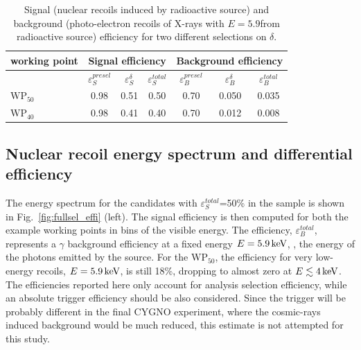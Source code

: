 \begin{table}[t]

\caption{Signal (nuclear recoils induced by \ambe radioactive source) and background (photo-electron recoils of X-rays
         with $E=5.9$\keV from \fe radioactive source) efficiency for
         two different selections on $\delta$.\label{tab:roc}}

\vspace{10pt}
\normalsize
\centering
\begin{tabular}{l c c c | c c c }
  \hline\hline
  working point & \multicolumn{3}{c}{Signal efficiency} & \multicolumn{3}{c}{Background efficiency} \\
  \hline
  & $\varepsilon_{S}^{presel}$ & $\varepsilon_{S}^{\delta}$ & $\varepsilon_{S}^{total}$ & $\varepsilon_{B}^{presel}$ & $\varepsilon_{B}^{\delta}$ & $\varepsilon_{B}^{total}$ \\
  \hline
  $\mathrm{WP}_{50}$  & 0.98                        & 0.51                      & 0.50                     & 0.70                     & 0.050                     & 0.035 \\
  $\mathrm{WP}_{40}$  & 0.98                        & 0.41                      & 0.40                     & 0.70                     & 0.012                     & 0.008 \\
  \hline\hline
\end{tabular}
\end{table}



\subsection{Nuclear recoil energy spectrum and differential efficiency}

The energy spectrum for the candidates with
$\varepsilon_{S}^{total}$=50\% in the \ambe sample is shown in
Fig.~\ref{fig:fullsel_effi} (left).  The signal efficiency is then
computed for both the example working points in bins of the visible
energy. The efficiency, $\varepsilon_{B}^{total}$, represents a
$\gamma$ background efficiency at a fixed energy $E=5.9\,\textrm{ke\hspace{-.08em}V}$, \ie, the
energy of the photons emitted by the \fe source. For the
$\mathrm{WP}_{50}$, the efficiency for very low-energy recoils,
$E=5.9\,\textrm{ke\hspace{-.08em}V}$, is still 18\%, dropping to almost zero at
$E\lesssim4\,\textrm{ke\hspace{-.08em}V}$. The efficiencies reported here only account for
analysis selection efficiency, while an absolute trigger efficiency
should be also considered.  Since the trigger will be probably
different in the final CYGNO experiment, where the cosmic-rays induced
background would be much reduced, this estimate is not attempted for
this study.

